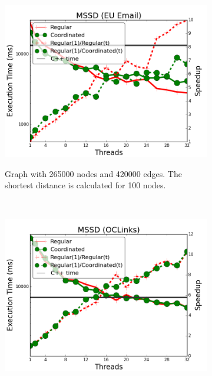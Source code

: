 \begin{figure}[]
        \centering
        \begin{subfigure}[b]{\plotsize\textwidth}
                \includegraphics[width=\textwidth]{experiments/coordination/cmp-shortest-email.png}
                \label{fig:coordination:coord_sssp_email}
                \caption{Graph with 265000 nodes and 420000 edges. The shortest
                distance is calculated for 100 nodes.}
        \end{subfigure}
        ~
        \begin{subfigure}[b]{\plotsize\textwidth}
                \includegraphics[width=\textwidth]{experiments/coordination/cmp-shortest-oclinks.png}
                \label{fig:coordination:coord_sssp_oclinks}

\end{subfigure}
\end{figure}
